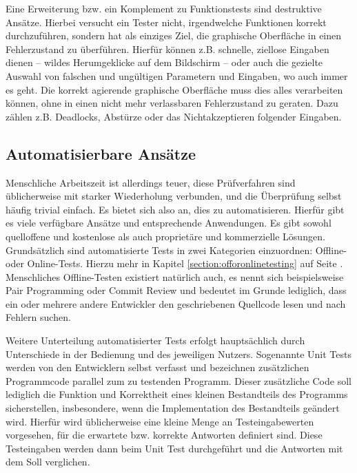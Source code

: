 Eine Erweiterung bzw. ein Komplement zu Funktionstests sind destruktive Ansätze.
Hierbei versucht ein Tester nicht, irgendwelche Funktionen korrekt durchzuführen,
sondern hat als einziges Ziel, die graphische Oberfläche in einen Fehlerzustand
zu überführen. Hierfür können z.B. schnelle, ziellose Eingaben dienen -- wildes Herumgeklicke
auf dem Bildschirm -- oder auch die gezielte Auswahl von falschen und ungültigen
Parametern und Eingaben, wo auch immer es geht. Die korrekt agierende
graphische Oberfläche muss dies alles verarbeiten können, ohne in einen nicht
mehr verlassbaren Fehlerzustand zu geraten. Dazu zählen z.B. Deadlocks,
Abstürze oder das Nichtakzeptieren folgender Eingaben.

\subsection{Automatisierbare Ansätze}

Menschliche Arbeitszeit ist allerdings teuer, diese Prüfverfahren sind üblicherweise
mit starker Wiederholung verbunden, und die Überprüfung selbst häufig trivial einfach.
Es bietet sich also an, dies zu automatisieren. Hierfür gibt es viele verfügbare Ansätze
und entsprechende Anwendungen. Es gibt sowohl quelloffene und kostenlose als auch proprietäre
und kommerzielle Lösungen. Grundsätzlich sind automatisierte Tests in zwei Kategorien einzuordnen:
Offline- oder Online-Tests. Hierzu mehr in Kapitel \ref{section:offoronlinetesting} auf Seite
\pageref{section:offoronlinetesting}. Menschliches Offline-Testen existiert natürlich auch,
es nennt sich beispielsweise \glqq{}Pair Programming\grqq{} oder \glqq{}Commit Review\grqq{}
und bedeutet im Grunde lediglich, dass ein oder mehrere andere Entwickler den geschriebenen Quellcode
lesen und nach Fehlern suchen.

Weitere Unterteilung automatisierter Tests erfolgt hauptsächlich durch Unterschiede
in der Bedienung und des jeweiligen Nutzers. Sogenannte \glqq{}Unit Tests\grqq{} werden
von den Entwicklern selbst verfasst und bezeichnen zusätzlichen Programmcode parallel
zum zu testenden Programm. Dieser zusätzliche Code soll lediglich die Funktion und Korrektheit
eines kleinen Bestandteils des Programms sicherstellen, insbesondere, wenn die Implementation
des Bestandteils geändert wird. Hierfür wird üblicherweise eine kleine Menge an Testeingabewerten
vorgesehen, für die erwartete bzw. korrekte Antworten definiert sind. Diese Testeingaben
werden dann beim Unit Test durchgeführt und die Antworten mit dem Soll verglichen.

